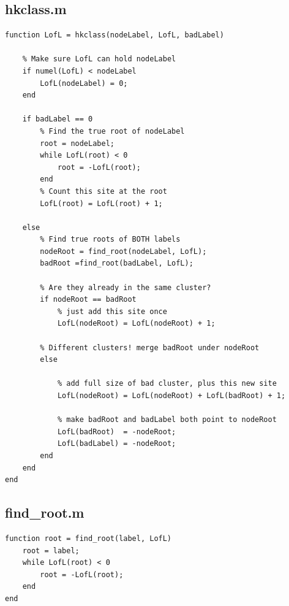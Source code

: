 \subsection*{hkclass.m}
\begin{lstlisting}[style=matlabstyle]
function LofL = hkclass(nodeLabel, LofL, badLabel)
    
    % Make sure LofL can hold nodeLabel
    if numel(LofL) < nodeLabel
        LofL(nodeLabel) = 0;
    end

    if badLabel == 0
        % Find the true root of nodeLabel
        root = nodeLabel;
        while LofL(root) < 0
            root = -LofL(root);
        end
        % Count this site at the root
        LofL(root) = LofL(root) + 1;
    
    else
        % Find true roots of BOTH labels
        nodeRoot = find_root(nodeLabel, LofL);
        badRoot =find_root(badLabel, LofL);         
        
        % Are they already in the same cluster?
        if nodeRoot == badRoot
            % just add this site once
            LofL(nodeRoot) = LofL(nodeRoot) + 1;
        
        % Different clusters! merge badRoot under nodeRoot
        else
        
            % add full size of bad cluster, plus this new site
            LofL(nodeRoot) = LofL(nodeRoot) + LofL(badRoot) + 1;

            % make badRoot and badLabel both point to nodeRoot
            LofL(badRoot)  = -nodeRoot;
            LofL(badLabel) = -nodeRoot;
        end
    end
end
\end{lstlisting}

\subsection*{find\_root.m}
\begin{lstlisting}[style=matlabstyle]
function root = find_root(label, LofL)
	root = label;
	while LofL(root) < 0
		root = -LofL(root);
	end
end
\end{lstlisting}

